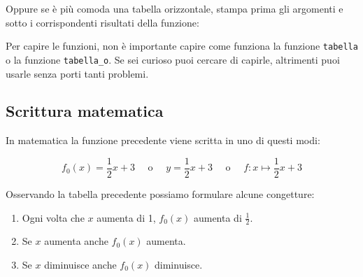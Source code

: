 
Oppure se è più comoda una tabella orizzontale, stampa prima gli 
argomenti e sotto i corrispondenti risultati della funzione:


\begin{osservazione}
Per capire le funzioni, non è importante capire come funziona la funzione 
\texttt{tabella} o la funzione \texttt{tabella\_o}.
Se sei curioso puoi cercare di capirle, altrimenti puoi usarle senza porti 
tanti problemi.
\end{osservazione}

\subsection{Scrittura matematica}

In matematica la funzione precedente viene scritta in uno di questi modi:

$$f_0(x) = \frac{1}{2}x +3 \quad \text{ o } \quad 
y= \frac{1}{2}x +3 \quad \text{ o } \quad 
f: x \mapsto \frac{1}{2}x +3$$

Osservando la tabella precedente possiamo formulare alcune congetture:

\begin{enumerate} [nosep]
\item Ogni volta che $x$ aumenta di 1, $f_0(x)$ aumenta di $\frac{1}{2}$.
\item Se $x$ aumenta anche $f_0(x)$ aumenta.
\item Se $x$ diminuisce anche $f_0(x)$ diminuisce.
\end{enumerate}


\subsection{}




\section{}
\label{sec:funzioni2_}



